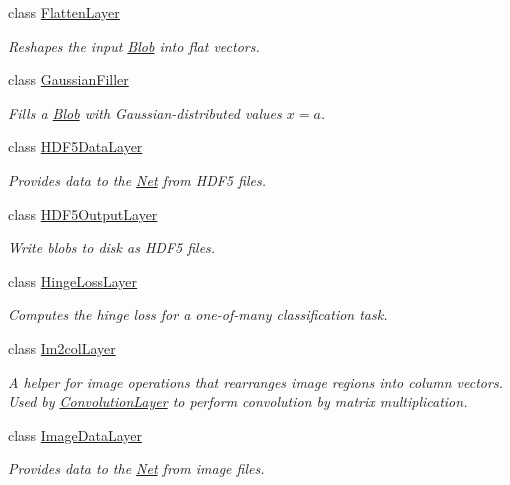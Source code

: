 \begin{DoxyCompactItemize}
class \hyperlink{classcaffe_1_1FlattenLayer}{Flatten\+Layer}
\begin{DoxyCompactList}\small\item\em Reshapes the input \hyperlink{classcaffe_1_1Blob}{Blob} into flat vectors. \end{DoxyCompactList}\item 
class \hyperlink{classcaffe_1_1GaussianFiller}{Gaussian\+Filler}
\begin{DoxyCompactList}\small\item\em Fills a \hyperlink{classcaffe_1_1Blob}{Blob} with Gaussian-\/distributed values $ x = a $. \end{DoxyCompactList}\item 
class \hyperlink{classcaffe_1_1HDF5DataLayer}{H\+D\+F5\+Data\+Layer}
\begin{DoxyCompactList}\small\item\em Provides data to the \hyperlink{classcaffe_1_1Net}{Net} from H\+D\+F5 files. \end{DoxyCompactList}\item 
class \hyperlink{classcaffe_1_1HDF5OutputLayer}{H\+D\+F5\+Output\+Layer}
\begin{DoxyCompactList}\small\item\em Write blobs to disk as H\+D\+F5 files. \end{DoxyCompactList}\item 
class \hyperlink{classcaffe_1_1HingeLossLayer}{Hinge\+Loss\+Layer}
\begin{DoxyCompactList}\small\item\em Computes the hinge loss for a one-\/of-\/many classification task. \end{DoxyCompactList}\item 
class \hyperlink{classcaffe_1_1Im2colLayer}{Im2col\+Layer}
\begin{DoxyCompactList}\small\item\em A helper for image operations that rearranges image regions into column vectors. Used by \hyperlink{classcaffe_1_1ConvolutionLayer}{Convolution\+Layer} to perform convolution by matrix multiplication. \end{DoxyCompactList}\item 
class \hyperlink{classcaffe_1_1ImageDataLayer}{Image\+Data\+Layer}
\begin{DoxyCompactList}\small\item\em Provides data to the \hyperlink{classcaffe_1_1Net}{Net} from image files. \end{DoxyCompactList}\item 

\end{DoxyCompactItemize}
